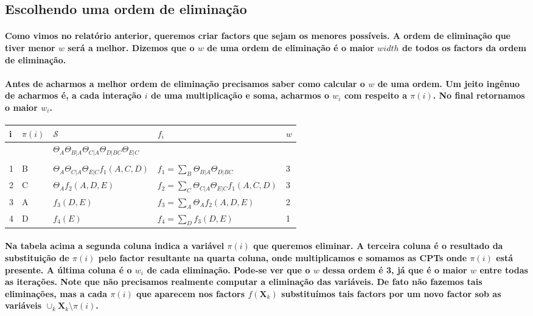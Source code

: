 \documentclass[a4paper,10pt]{article}
\theoremstyle{plain}
\begin{document}
\subsection{Escolhendo uma ordem de eliminação}

\paragraph{
  Como vimos no relatório anterior\cite{report-2}, queremos criar factors que sejam os menores
  possíveis. A ordem de eliminação que tiver menor $w$ será a melhor. Dizemos que o $w$ de uma
  ordem de eliminação é o maior $width$ de todos os factors da ordem de eliminação.
}

\paragraph{
  Antes de acharmos a melhor ordem de eliminação precisamos saber como calcular o $w$ de uma ordem.
  Um jeito ingênuo de acharmos é, a cada interação $i$ de uma multiplicação e soma, acharmos o
  $w_i$ com respeito a $\pi(i)$. No final retornamos o maior $w_i$.
}

\begin{table}[h]
  \begin{center}
    \begin{tabular}{*{4}{l|} l}
      i & $\pi(i)$ & $\mathcal{S}$ & $f_i$ & $w$ \\
      \hline
      & & $\Theta_A \Theta_{B|A} \Theta_{C|A} \Theta_{D|BC} \Theta_{E|C}$ & & \\
      & & & & \\
      1 & B & $\Theta_A \Theta_{C|A} \Theta_{E|C} f_1(A, C, D)$ & $f_1 = \sum_B \Theta_{B|A} \Theta_{D|BC}$ & 3 \\
      2 & C & $\Theta_A f_2(A, D, E)$ & $f_2 = \sum_C \Theta_{C|A} \Theta_{E|C} f_1(A, C, D)$ & 3 \\
      3 & A & $f_3(D, E)$ & $f_3 = \sum_A \Theta_A f_2(A, D, E)$ & 2 \\
      4 & D & $f_4(E)$ & $f_4 = \sum_D f_3(D, E)$ & 1 \\
    \end{tabular}
  \end{center}
\end{table}

\paragraph{
  Na tabela acima a segunda coluna indica a variável $\pi(i)$ que queremos eliminar. A terceira
  coluna é o resultado da substituição de $\pi(i)$ pelo factor resultante na quarta coluna, onde
  multiplicamos e somamos as CPTs onde $\pi(i)$ está presente. A última coluna é o $w_i$ de cada
  eliminação. Pode-se ver que o $w$ dessa ordem é 3, já que é o maior $w$ entre todas as iterações.
  Note que não precisamos realmente computar a eliminação das variáveis. De fato não fazemos tais
  eliminações, mas a cada $\pi(i)$ que aparecem nos factors $f(\textbf{X}_k)$ substituímos tais
  factors por um novo factor sob as variáveis $\cup_k \textbf{X}_k \setminus {\pi(i)}$.
}
\end{document}
